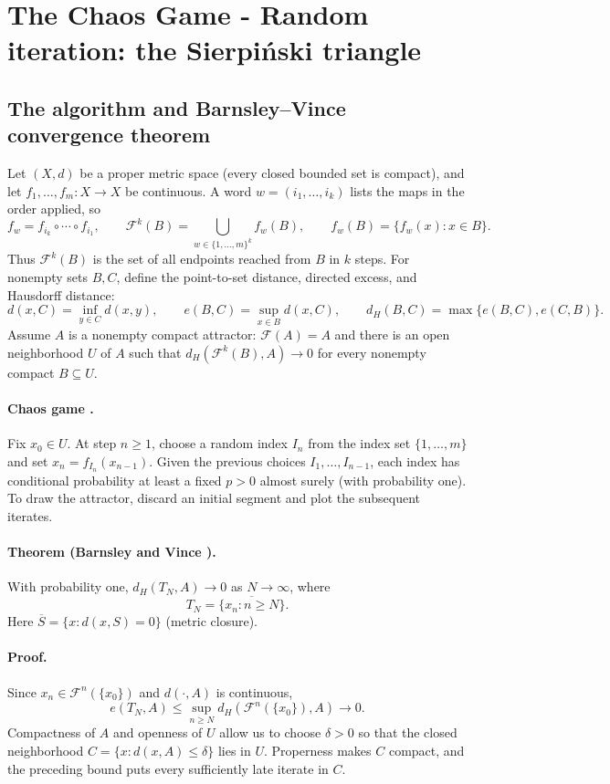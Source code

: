 \documentclass[11pt]{article}
\begin{document}
\section{The Chaos Game - Random iteration: the Sierpi\'nski triangle}

\subsection{The algorithm and Barnsley--Vince convergence theorem}

Let $(X,d)$ be a proper metric space (every closed bounded set is compact), and let
$f_1,\ldots,f_m:X\to X$ be continuous.
A word $w=(i_1,\ldots,i_k)$ lists the maps in the order applied, so
\[
  f_w=f_{i_k}\circ\cdots\circ f_{i_1},\qquad
  \mathcal F^k(B)=\bigcup_{w\in\{1,\ldots,m\}^k} f_w(B),
  \qquad f_w(B)=\{f_w(x):x\in B\}.
\]
Thus $\mathcal F^k(B)$ is the set of all endpoints reached from $B$ in $k$ steps.
For nonempty sets $B,C$, define the point-to-set distance, directed excess, and Hausdorff distance:
\[
  d(x,C)=\inf_{y\in C}d(x,y),\qquad e(B,C)=\sup_{x\in B}d(x,C),\qquad
  d_H(B,C)=\max\{e(B,C),e(C,B)\}.
\]
Assume $A$ is a nonempty compact attractor: $\mathcal F(A)=A$ and there is an open neighborhood $U$ of $A$
such that $d_H(\mathcal F^k(B),A)\to0$ for every nonempty compact $B\subseteq U$.

\paragraph{Chaos game \cite[Chapter~III, Section~8]{barnsley-book}.}
Fix $x_0\in U$.
At step $n\ge1$, choose a random index $I_n$ from the index set $\{1,\ldots,m\}$ and set $x_n=f_{I_n}(x_{n-1})$.
Given the previous choices $I_1,\ldots,I_{n-1}$, each index has conditional probability at least a fixed $p>0$
almost surely (with probability one).
To draw the attractor, discard an initial segment and plot the subsequent iterates.

\paragraph{Theorem (Barnsley and Vince \cite[Theorem~1]{barnsley-vince}).}
With probability one, $d_H(T_N,A)\to0$ as $N\to\infty$, where
\[
  T_N=\overline{\{x_n:n\ge N\}}.
\]
Here $\overline S=\{x:d(x,S)=0\}$ (metric closure).

\paragraph{Proof.}
Since $x_n\in\mathcal F^n(\{x_0\})$ and $d(\cdot,A)$ is continuous,
\[
  e(T_N,A)\le\sup_{n\ge N}d_H(\mathcal F^n(\{x_0\}),A)\longrightarrow0.
\]
Compactness of $A$ and openness of $U$ allow us to choose $\delta>0$ so that the closed neighborhood
$C=\{x:d(x,A)\le\delta\}$ lies in $U$.
Properness makes $C$ compact, and the preceding bound puts every sufficiently late iterate in $C$.
\end{document}
